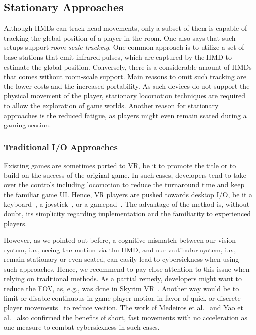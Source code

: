 \subsection{Stationary Approaches}

Although HMDs can track head movements, only a subset of them is capable of tracking the global position of a player in the room. One also says that such setups support \textit{room-scale tracking}. One common approach is to utilize a set of base stations that emit infrared pulses, which are captured by the HMD to estimate the global position. Conversely, there is a considerable amount of HMDs that comes without room-scale support. Main reasons to omit such tracking are the lower costs and the increased portability. As such devices do not support the physical movement of the player, stationary locomotion techniques are required to allow the exploration of game worlds. Another reason for stationary approaches is the reduced fatigue, as players might even remain seated during a gaming session.





\subsubsection{Traditional I/O Approaches}

Existing games are sometimes ported to VR, be it to promote the title or to build on the success of the original game. In such cases, developers tend to take over the controls including locomotion to reduce the turnaround time and keep the familiar game UI. Hence, VR players are pushed towards desktop I/O, be it a keyboard~\cite{argelaguet2016giant}, a joystick~\cite{bozgeyikli2016locomotion}, or a gamepad~\cite{fernandes2016combating}. The advantage of the method is, without doubt, its simplicity regarding implementation and the familiarity to experienced players.

However, as we pointed out before, a cognitive mismatch between our vision system, i.e., seeing the motion via the HMD, and our vestibular system, i.e., remain stationary or even seated, can easily lead to cybersickness when using such approaches. Hence, we recommend to pay close attention to this issue when relying on traditional methods. As a partial remedy, developers might want to reduce the FOV, as, e.g., was done in Skyrim VR~\cite{SkyrimVR}. Another way would be to limit or disable continuous in-game player motion in favor of quick or discrete player movements~\cite{Habgood:2017:HLP:3130859.3131437} to reduce vection. The work of Medeiros et al.~\cite{medeiros2016effects} and Yao et al.~\cite{yao2014oculus} also confirmed the benefits of short, fast movements with no acceleration as one measure to combat cybersickness in such cases.

